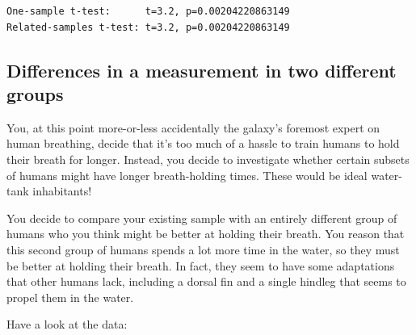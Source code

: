 \documentclass[11pt]{article}
\begin{document}
    \begin{Verbatim}[commandchars=\\\{\}]
One-sample t-test:      t=3.2, p=0.00204220863149
Related-samples t-test: t=3.2, p=0.00204220863149

    \end{Verbatim}

    \subsection{Differences in a measurement in two different
groups}\label{differences-in-a-measurement-in-two-different-groups}

You, at this point more-or-less accidentally the galaxy's foremost
expert on human breathing, decide that it's too much of a hassle to
train humans to hold their breath for longer. Instead, you decide to
investigate whether certain subsets of humans might have longer
breath-holding times. These would be ideal water-tank inhabitants!

You decide to compare your existing sample with an entirely different
group of humans who you think might be better at holding their breath.
You reason that this second group of humans spends a lot more time in
the water, so they must be better at holding their breath. In fact, they
seem to have some adaptations that other humans lack, including a dorsal
fin and a single hindleg that seems to propel them in the water.

Have a look at the data:
\end{document}
